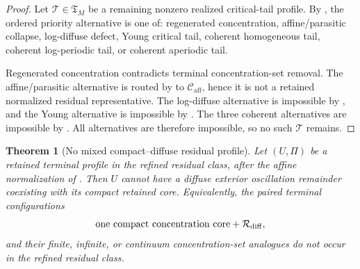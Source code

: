 \documentclass[11pt]{amsart}
\numberwithin{equation}{section}
\theoremstyle{plain}
\newtheorem{theorem}{Theorem}[section]
\theoremstyle{definition}
\theoremstyle{remark}
\newcommand{\Caff}{\mathcal C_{\mathrm{aff}}}
\newcommand{\Tcrit}{\mathfrak T_M}
\begin{document}
\begin{proof}
Let \(\mathcal T\in\Tcrit\) be a remaining nonzero realized critical-tail profile.
By , the ordered priority alternative
is one of: regenerated concentration, affine/parasitic collapse, log-diffuse defect,
Young critical tail, coherent homogeneous tail, coherent log-periodic tail, or
coherent aperiodic tail.

Regenerated concentration contradicts terminal concentration-set removal.  The
affine/parasitic alternative is routed by
 to \(\Caff\), hence it is not a
retained normalized residual representative.  The log-diffuse alternative is
impossible by , and the Young
alternative is impossible by .  The three coherent alternatives are impossible by
.  All alternatives are
therefore impossible, so no such \(\mathcal T\) remains.
\end{proof}

\begin{theorem}[No mixed compact--diffuse residual profile]
\label{thm:no-mixed-compact-diffuse}
Let \((U,\Pi)\) be a retained terminal profile in the refined residual class,
after the affine normalization of .
Then \(U\) cannot have a diffuse exterior oscillation remainder coexisting with
its compact retained core.  Equivalently, the paired terminal configurations
\[
   \hbox{one compact concentration core}+\mathcal R_{\rm diff},
\]
and their finite, infinite, or continuum concentration-set analogues do not occur in
the refined residual class.
\end{theorem}
\end{document}
